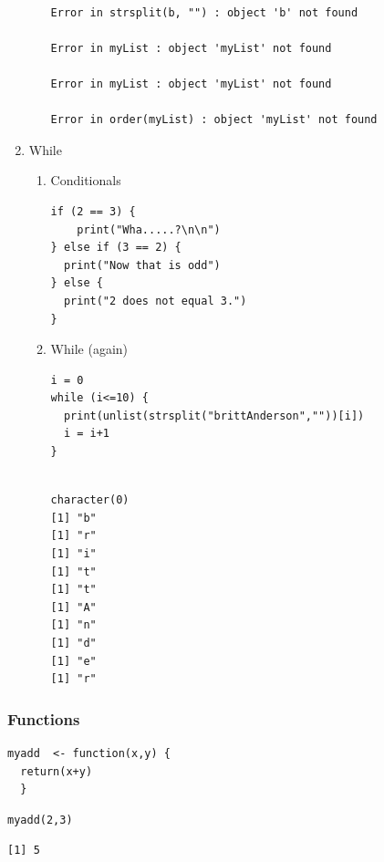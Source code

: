 \documentclass{article}
\begin{document}
\begin{enumerate}
\begin{enumerate}
\begin{verbatim}

Error in strsplit(b, "") : object 'b' not found

Error in myList : object 'myList' not found

Error in myList : object 'myList' not found

Error in order(myList) : object 'myList' not found
\end{verbatim}
\end{enumerate}

\item While
\label{sec:orgc14715a}
\begin{enumerate}
\item Conditionals
\label{sec:org387c237}
\begin{verbatim}
if (2 == 3) {
    print("Wha.....?\n\n")
} else if (3 == 2) {
  print("Now that is odd")
} else {
  print("2 does not equal 3.")
}
\end{verbatim}
\item While (again)
\label{sec:org8ad52a9}
\begin{verbatim}
i = 0
while (i<=10) {
  print(unlist(strsplit("brittAnderson",""))[i])
  i = i+1
}
\end{verbatim}

\begin{verbatim}

character(0)
[1] "b"
[1] "r"
[1] "i"
[1] "t"
[1] "t"
[1] "A"
[1] "n"
[1] "d"
[1] "e"
[1] "r"
\end{verbatim}
\end{enumerate}
\end{enumerate}


\subsubsection{Functions}
\label{sec:orge442297}
\begin{verbatim}
myadd  <- function(x,y) {
  return(x+y)
  }
\end{verbatim}

\begin{verbatim}
myadd(2,3)
\end{verbatim}

\begin{verbatim}
[1] 5
\end{verbatim}
\end{document}
